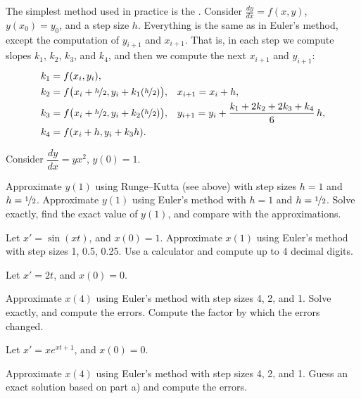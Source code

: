 The simplest method used in practice is the
\emph{}.
Consider $\frac{dy}{dx}=f(x,y)$, $y(x_0) = y_0$,
and a step size $h$.  Everything is the same as in Euler's method, except
the computation of $y_{i+1}$ and $x_{i+1}$.
That is, in each step we compute slopes $k_1$, $k_2$, $k_3$, and $k_4$,
and then we compute the next $x_{i+1}$ and $y_{i+1}$:
\begin{align*}
& k_1 = f(x_i,y_i) , & & \\
& k_2 = f\bigl(x_i + \nicefrac{h}{2},y_i + k_1 (\nicefrac{h}{2})\bigr) ,
& & 
x_{i+1} = x_i + h , \\
& k_3 = f\bigl(x_i + \nicefrac{h}{2},y_i + k_2 (\nicefrac{h}{2})\bigr) ,
& &
y_{i+1} = y_i + \frac{k_1 + 2k_2 + 2k_3 + k_4}{6}\,h ,  \\
& k_4 = f(x_i + h,y_i + k_3 h) .
\end{align*}

\begin{exercise}
\pagebreak[2]
Consider $\dfrac{dy}{dx} = yx^2$, $y(0)=1$.
\begin{tasks}
\task Approximate $y(1)$
using Runge--Kutta (see above) with step sizes $h=1$ and
$h=\nicefrac{1}{2}$.
\task Approximate $y(1)$ using Euler's method with $h=1$ and
$h=\nicefrac{1}{2}$.
\task Solve exactly, find the exact value of
$y(1)$, and compare with the approximations.
\end{tasks}
\end{exercise}

\setcounter{exercise}{100}

\begin{exercise}
Let $x' = \sin(xt)$, and $x(0)=1$.
Approximate $x(1)$ using Euler's method with step sizes 1, 0.5, 0.25.
Use a calculator and compute up to 4 decimal digits.
\end{exercise}

\begin{exercise}
Let $x' = 2t$, and $x(0)=0$.
\begin{tasks}
\task Approximate $x(4)$ using Euler's method with step sizes 4, 2, and 1.
\task Solve exactly, and compute the errors.
\task Compute the factor by which the errors changed.
\end{tasks}
\end{exercise}

\begin{samepage}
\begin{exercise}
Let $x' = x e^{xt+1}$, and $x(0)=0$.
\begin{tasks}
\task Approximate $x(4)$ using Euler's method with step sizes 4, 2, and 1.
\task Guess an exact solution based on part a) and compute the errors.
\end{tasks}
\end{exercise}
\end{samepage}

